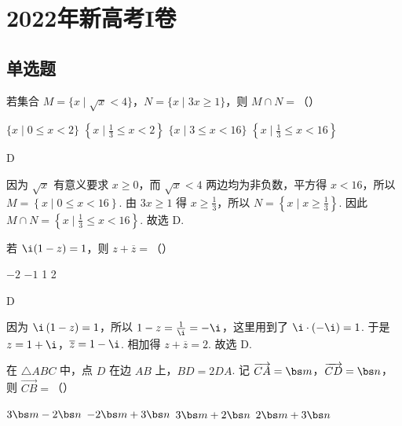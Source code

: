 \chapter{2022年新高考I卷}

\section{单选题}

\begin{problem}
若集合 \(M=\{x\mid \sqrt{x}<4\}\)，\(N=\{x\mid 3x\ge 1\}\)，则 \(M\cap N=\)（\quad）

\choices
    {\(\{x\mid 0\le x<2\}\)}
    {\(\left\{x\mid \frac13\le x<2\right\}\)}
    {\(\{x\mid 3\le x<16\}\)}
    {\(\left\{x\mid \frac13\le x<16\right\}\)}
\end{problem}

\begin{answer}
D
\end{answer}

\begin{solution}
因为 \(\sqrt{x}\) 有意义要求 \(x\ge 0\)，而 \(\sqrt{x}<4\) 两边均为非负数，平方得 \(x<16\)，所以 \(M=\left\{x\mid 0\le x<16\right\}\). 由 \(3x\ge 1\) 得 \(x\ge \frac13\)，所以 \(N=\left\{x\mid x\ge \frac13\right\}\). 因此 \(M\cap N=\left\{x\mid \frac13\le x<16\right\}\). 故选 D.
\end{solution}

\begin{problem}
若 \(\i(1-z)=1\)，则 \(z+\overline{z}=\)（\quad）

\choices
    {\(-2\)}
    {\(-1\)}
    {1}
    {2}
\end{problem}

\begin{answer}
D
\end{answer}

\begin{solution}
因为 \(\i\left(1-z\right)=1\)，所以 \(1-z=\frac{1}{\i}=-\i\)，这里用到了 \(\i\cdot \left(-\i\right)=1\). 于是 \(z=1+\i\)，\(\overline{z}=1-\i\). 相加得 \(z+\overline{z}=2\). 故选 D.
\end{solution}

\begin{problem}
在 \(\triangle ABC\) 中，点 \(D\) 在边 \(AB\) 上，\(BD=2DA\). 记 \(\overrightarrow{CA}=\bs m\)，\(\overrightarrow{CD}=\bs n\)，则 \(\overrightarrow{CB}=\)（\quad）

\choices
    {\(3\bs m-2\bs n\)}
    {\(-2\bs m+3\bs n\)}
    {\(3\bs m+2\bs n\)}
    {\(2\bs m+3\bs n\)}
\end{problem}

